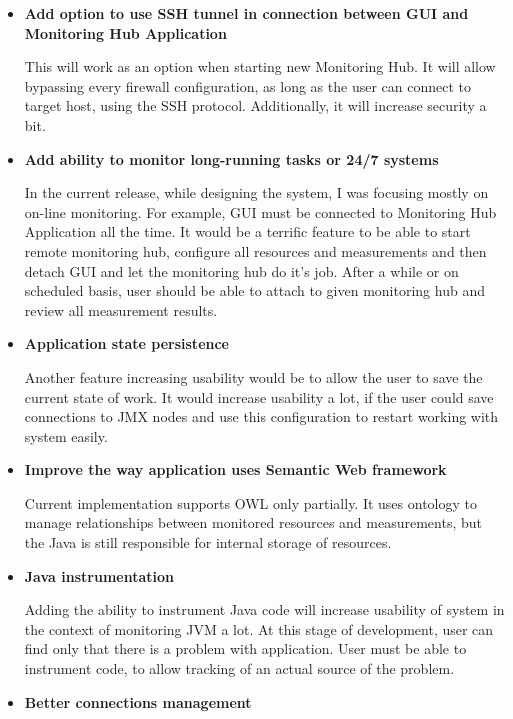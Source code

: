 \begin{itemize}

\item {\bf Add option to use SSH tunnel in connection between GUI and Monitoring Hub Application}

This will work as an option when starting new Monitoring Hub. It will allow bypassing every firewall configuration, as long as the user can connect to target host, using the SSH protocol. Additionally, it will increase security a bit.

\item {\bf Add ability to monitor long-running tasks or 24/7 systems }

In the current release, while designing the system, I was focusing mostly on on-line monitoring. For example, GUI must be connected to Monitoring Hub Application all the time. It would be a terrific feature to be able to start remote monitoring hub, configure all resources and measurements and then detach GUI and let the monitoring hub do it\rq{}s job. After a while or on scheduled basis, user should be able to attach to given monitoring hub and review all measurement results.

\item {\bf Application state persistence }

Another feature increasing usability would be to allow the user to save the current state of work. It would increase usability a lot, if the user could save connections to JMX nodes and use this configuration to restart working with system easily.

\item {\bf Improve the way application uses Semantic Web framework}

Current implementation supports OWL only partially. It uses ontology to manage relationships between monitored resources and measurements, but the Java is still responsible for internal storage of resources.

\item {\bf Java instrumentation}

Adding the ability to instrument Java code will increase usability of system in the context of monitoring JVM a lot. At this stage of development, user can find only that there is a problem with application. User must be able to instrument code, to allow tracking of an actual source of the problem.

\item {\bf Better connections management}


\end{itemize}
